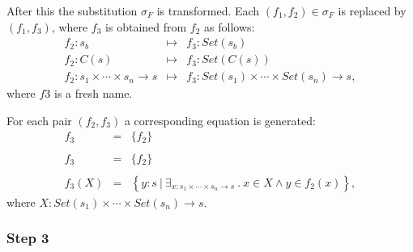 \documentclass{article}
\begin{document}
After this the substitution $\sigma _{F}$ is transformed. Each $%
(f_{1},f_{2})\in \sigma _{F}$ is replaced by $(f_{1},f_{3})$, where $f_{3}$
is obtained from $f_{2}$ as follows:%
\begin{equation*}
\begin{array}{lcl}
f_{2}:s_{b} & \mapsto & f_{3}:Set(s_{b}) \\ 
f_{2}:C(s) & \mapsto & f_{3}:Set(C(s)) \\ 
f_{2}:s_{1}\times \cdots \times s_{n}\rightarrow s & \mapsto & 
f_{3}:Set(s_{1})\times \cdots \times Set(s_{n})\rightarrow s,%
\end{array}%
\end{equation*}%
where $f3$ is a fresh name.

For each pair $(f_{2},f_{3})$ a corresponding equation is generated:%
\begin{equation*}
\begin{array}{lcl}
f_{3} & = & \{f_{2}\} \\ 
&  &  \\ 
f_{3} & = & \{f_{2}\} \\ 
&  &  \\ 
f_{3}(X) & = & \left\{ y:s\ |\ \exists _{x:s_{1}\times \cdots \times
s_{n}\rightarrow s}\ .\ x\in X\wedge y\in f_{2}(x)\right\} ,%
\end{array}%
\end{equation*}%
where $X:Set(s_{1})\times \cdots \times Set(s_{n})\rightarrow s$.

\subsubsection{Step 3}
\end{document}
